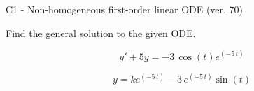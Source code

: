 \begin{exercise}
  \begin{exerciseTitle}C1 - Non-homogeneous first-order linear ODE (ver. 70)\end{exerciseTitle}
  \begin{exerciseStatement}
    
Find the general solution to the given ODE.

    
\[y'+5y= -3 \, \cos\left(t\right) e^{\left(-5 \, t\right)}\]

  \end{exerciseStatement}
  \begin{exerciseAnswer}
    
\[y= k e^{\left(-5 \, t\right)} - 3 \, e^{\left(-5 \, t\right)} \sin\left(t\right)\]

  \end{exerciseAnswer}
\end{exercise}